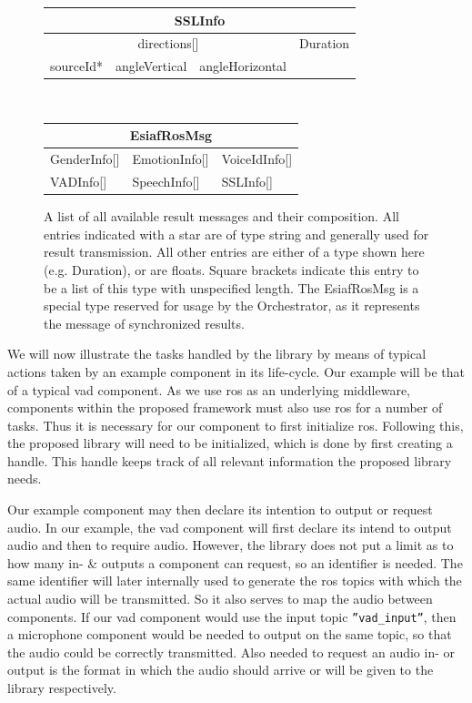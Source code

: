 \begin{figure}[]
	\begin{tabular}{| l | l | l | l|}
		\hline
		
		\multicolumn{4}{|c|}{\textbf{SSLInfo}} \\ \hline
		\multicolumn{3}{|c|}{directions[]} & Duration  \\\cline{1-3}
		sourceId* & angleVertical & angleHorizontal & \\\hline
	\end{tabular}\\\vspace{0.3cm}
	
	\begin{tabular}{| l | l | l |}
		\hline
		
		\multicolumn{3}{|c|}{\textbf{EsiafRosMsg}} \\ \hline
		GenderInfo[]	& EmotionInfo[]	& VoiceIdInfo[]	\\\hline
		VADInfo[]	& SpeechInfo[]	& SSLInfo[] \\\hline
	\end{tabular}
	\caption{A list of all available result messages and their composition.
		All entries indicated with a star are of type string and generally used for result transmission.
		All other entries are either of a type shown here (e.g. Duration), or are floats.
		Square brackets indicate this entry to be a list of this type with unspecified length.
		The EsiafRosMsg is a special type reserved for usage by the Orchestrator, as it represents the message of synchronized results.
		}
	\label{table:main:lib:messages}
\end{figure}


We will now illustrate the tasks handled by the library by means of typical actions taken by an example component in its life-cycle.
Our example will be that of a typical \gls{vad} component.
As we use \gls{ros} as an underlying middleware, components within the proposed framework must also use \gls{ros} for a number of tasks.
Thus it is necessary for our component to first initialize \gls{ros}.
Following this, the proposed library will need to be initialized, which is done by first creating a handle.
This handle keeps track of all relevant information the proposed library needs.

Our example component may then declare its intention to output or request audio.
In our example, the \gls{vad} component will first declare its intend to output audio and then to require audio.
However, the library does not put a limit as to how many in- \& outputs a component can request, so an identifier is needed.
The same identifier will later internally used to generate the \gls{ros} topics with which the actual audio will be transmitted.
So it also serves to map the audio between components.%
If our \gls{vad} component would use the input topic \texttt{''vad\_input''}, then a microphone component would be needed to output on the same topic, so that the audio could be correctly transmitted.
Also needed to request an audio in- or output is the format in which the audio should arrive or will be given to the library respectively.

